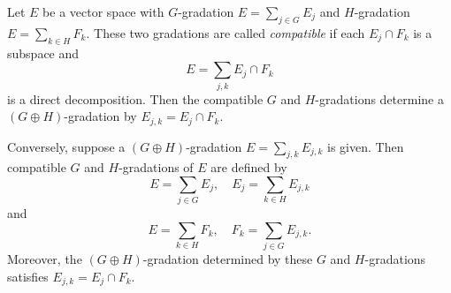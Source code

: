 Let $E$ be a vector space with $G$-gradation $E = \sum_{j \in G} E_j$ and $H$-gradation $E = \sum_{k \in H} F_k$. These two gradations are called \textit{compatible} if each $E_j \cap F_k$ is a subspace and
$$E = \sum_{j,k} E_j \cap F_k$$
is a direct decomposition. Then the compatible $G$ and $H$-gradations determine a $(G \oplus H)$-gradation by $E_{j,k} = E_j \cap F_k$.

Conversely, suppose a $(G \oplus H)$-gradation $E = \sum_{j,k} E_{j,k}$ is given. Then compatible $G$ and $H$-gradations of $E$ are defined by
$$E = \sum_{j \in G} E_j, \quad E_j = \sum_{k \in H} E_{j,k}$$
and
$$E = \sum_{k \in H} F_k, \quad F_k = \sum_{j \in G} E_{j,k}.$$
Moreover, the $(G \oplus H)$-gradation determined by these $G$ and $H$-gradations satisfies $E_{j,k} = E_j \cap F_k$.
